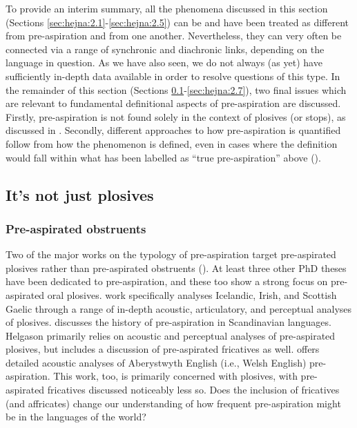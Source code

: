 \documentclass[output=paper]{langscibook}
\begin{document}
To provide an interim summary, all the phenomena discussed in this section (Sections \ref{sec:hejna:2.1}-\ref{sec:hejna:2.5}) can be and have been treated as different from pre\hyp aspiration and from one another. Nevertheless, they can very often be connected via a range of synchronic and diachronic links, depending on the language in question. As we have also seen, we do not always (as yet) have sufficiently in-depth data available in order to resolve questions of this type. In the remainder of this section (Sections \ref{sec:hejna:2.6}-\ref{sec:hejna:2.7}), two final issues which are relevant to fundamental definitional aspects of pre\hyp aspiration are discussed. Firstly, pre\hyp aspiration is not found solely in the context of plosives (or stops), as discussed in . Secondly, different approaches to how pre\hyp aspiration is quantified follow from how the phenomenon is defined, even in cases where the definition would fall within what has been labelled as “true pre-aspiration” above ().

\subsection{It’s not just plosives}\label{sec:hejna:2.6}
\subsubsection{Pre-aspirated obstruents}\label{sec:hejna:2.6.1}

Two of the major works on the typology of pre\hyp aspiration target pre-aspirated plosives rather than pre-aspirated obstruents (\citealt{Silverman2003, Clayton2010}). At least three other PhD theses have been dedicated to pre-aspiration, and these too show a strong focus on pre-aspirated oral plosives.  work specifically analyses Icelandic, Irish, and Scottish Gaelic through a range of in-depth acoustic, articulatory, and perceptual analyses of plosives. \citet{Helgason2002} discusses the history of pre\hyp aspiration in Scandinavian languages. Helgason primarily relies on acoustic and perceptual analyses of pre-aspirated plosives, but includes a discussion of pre-aspirated fricatives as well. \citet{Hejná2015} offers detailed acoustic analyses of Aberystwyth English (i.e., Welsh English) pre-aspiration. This work, too, is primarily concerned with plosives, with pre-aspirated fricatives discussed noticeably less so. Does the inclusion of fricatives (and affricates) change our understanding of how frequent pre\hyp aspiration might be in the languages of the world?
\end{document}
